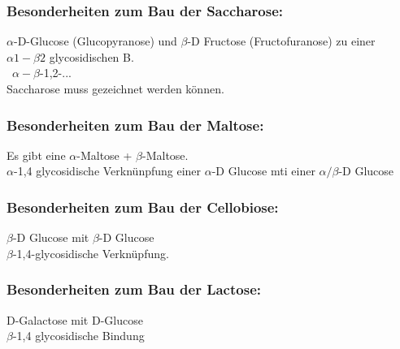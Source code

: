 \subsubsection{Besonderheiten zum Bau der Saccharose:}
$\alpha$-D-Glucose (Glucopyranose) und $\beta$-D Fructose (Fructofuranose) zu einer $\alpha 1 -\beta 2$ glycosidischen B. \\ 
\textrightarrow\ $\alpha-\beta$-1,2-... \\
Saccharose muss gezeichnet werden können.

\subsubsection{Besonderheiten zum Bau der Maltose:}
Es gibt eine $\alpha$-Maltose + $\beta$-Maltose. \\
$\alpha$-1,4 glycosidische Verknünpfung einer $\alpha$-D Glucose mti einer $\alpha/\beta$-D Glucose

\subsubsection{Besonderheiten zum Bau der Cellobiose:}
$\beta$-D Glucose mit $\beta$-D Glucose \\
$\beta$-1,4-glycosidische Verknüpfung.

\subsubsection{Besonderheiten zum Bau der Lactose:}
D-Galactose mit D-Glucose \\
$\beta$-1,4 glycosidische Bindung


